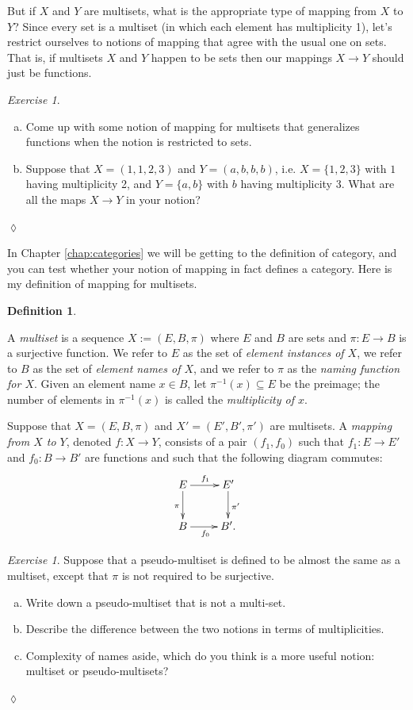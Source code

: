 \documentclass{book}
\def\to{\rightarrow}
\def\taking{\colon}
\def\ss{\subseteq}
\def\m1{{-1}}
\theoremstyle{remark}
\newtheorem{exc}[subsubsection]{Exercise}
\newenvironment{exercise}{\begin{exc}}{\hspace*{\fill}$\lozenge$\end{exc}}
\theoremstyle{definition}
\newtheorem{definition}[subsubsection]{Definition}
\def\sexc{\begin{enumerate}[a.)]\setlength{\itemsep}{.1cm}\setlength{\parskip}{.1cm}\item}
\def\next{\item}
\def\endsexc{\end{enumerate}}
\begin{document}
But if $X$ and $Y$ are multisets, what is the appropriate type of mapping from $X$ to $Y$? Since every set is a multiset (in which each element has multiplicity 1), let's restrict ourselves to notions of mapping that agree with the usual one on sets. That is, if multisets $X$ and $Y$ happen to be sets then our mappings $X\to Y$ should just be functions.

\begin{exercise}\label{exc:multiset 1}~
\sexc Come up with some notion of mapping for multisets that generalizes functions when the notion is restricted to sets. 
\next Suppose that $X=(1,1,2,3)$ and $Y=(a,b,b,b)$, i.e. $X=\{1,2,3\}$ with $1$ having multiplicity 2, and $Y=\{a,b\}$ with $b$ having multiplicity 3. What are all the maps $X\to Y$ in your notion?
\endsexc
\end{exercise}

In Chapter \ref{chap:categories} we will be getting to the definition of category, and you can test whether your notion of mapping in fact defines a category. Here is my definition of mapping for multisets.

\begin{definition}\label{def:multiset}

A {\em multiset} is a sequence $X:=(E,B,\pi)$ where $E$ and $B$ are sets and $\pi\taking E\to B$ is a surjective function. We refer to $E$ as the set of {\em element instances of $X$}, we refer to $B$ as the set of {\em element names of $X$}, and we refer to $\pi$ as the {\em naming function for $X$}. Given an element name $x\in B$, let $\pi^\m1(x)\ss E$ be the preimage; the number of elements in $\pi^\m1(x)$ is called the {\em multiplicity of $x$}.

Suppose that $X=(E,B,\pi)$ and $X'=(E',B',\pi')$ are multisets. A {\em mapping from $X$ to $Y$}, denoted $f\taking X\to Y$, consists of a pair $(f_1,f_0)$ such that $f_1\taking E\to E'$ and $f_0\taking B\to B'$ are functions and such that the following diagram commutes:
\begin{align}\label{dia:multiset map}
\xymatrix{E\ar[r]^{f_1}\ar[d]_{\pi}&E'\ar[d]^{\pi'}\\B\ar[r]_{f_0}&B'.}
\end{align}

\end{definition}

\begin{exercise}
Suppose that a pseudo-multiset is defined to be almost the same as a multiset, except that $\pi$ is not required to be surjective. 
\sexc Write down a pseudo-multiset that is not a multi-set. 
\next Describe the difference between the two notions in terms of multiplicities. 
\next Complexity of names aside, which do you think is a more useful notion: multiset or pseudo-multisets? 
\endsexc
\end{exercise}
\end{document}
